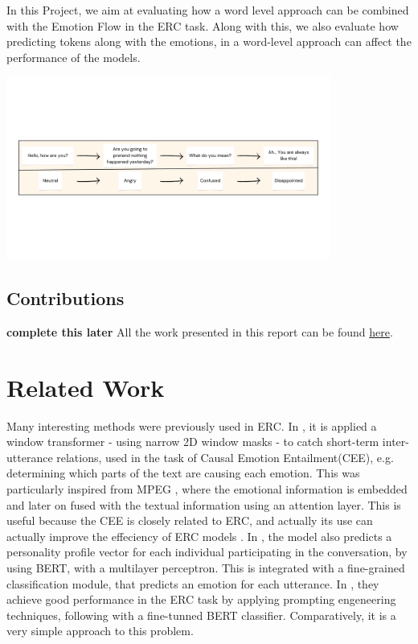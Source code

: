 \documentclass[oneside, a4paper, onecolumn, 11pt]{article}
\begin{document}
In this Project, we aim at evaluating how a word level approach can be combined with the Emotion Flow in the ERC task. Along with this, we also evaluate 
how predicting tokens along with the emotions, in a word-level approach can affect the performance of the models.

\begin{center}
\includegraphics[width=0.8\textwidth]{img/dialogue_example/emotion_flow}
\end{center}

\subsection{Contributions}
\textbf{complete this later}
All the work presented in this report can be found \href{https://github.com/bruno-iorio/thesis-work}{here}.


\section{Related Work} 
Many interesting methods were previously used in ERC. In \cite{LIU2025126924}, it is applied a window transformer - using narrow
2D window masks - to catch short-term inter-utterance relations, used in the task of Causal Emotion Entailment(CEE), e.g. determining
which parts of the text are causing each emotion. This was particularly inspired from MPEG \cite{10252019}, where the emotional information 
is embedded and later on fused with the textual information using an attention layer. This is useful because the CEE is closely related to ERC,
and actually its use can actually improve the effeciency of ERC models \cite{LIU2025126924}. In \cite{wang-etal-2024-emotion}, the model 
also predicts a personality profile vector for each individual participating in the conversation, by using BERT, with a multilayer perceptron.
This is integrated with a fine-grained classification  module, that predicts an emotion for each utterance. In \cite{qin2023bertercfinetuningbertemotion}, they achieve
good performance in the ERC task by applying prompting engeneering techniques, following with a fine-tunned BERT classifier. Comparatively, it 
is a very simple approach to this problem.
\end{document}
